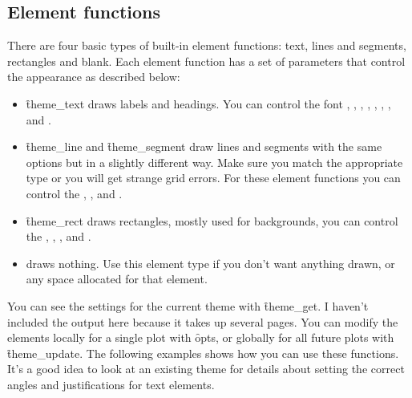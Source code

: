 \subsection{Element functions}
\label{sub:element-functions}

There are four basic types of built-in element functions: text, lines and segments, rectangles and blank.  Each element function has a set of parameters that control the appearance as described below:

\begin{itemize}
  \item \f{theme_text} draws labels and headings. You can control the font , , , , , , , and .

  \item \f{theme_line} and \f{theme_segment} draw lines and segments with the same options but in a slightly different way.  Make sure you match the appropriate type or you will get strange grid errors.  For these element functions you can control the , , and .

  \item \f{theme_rect} draws rectangles, mostly used for backgrounds, you can control the , , , and .

  \item {} draws nothing.  Use this element type if you don't want anything drawn, or any space allocated for that element.  

\end{itemize}

You can see the settings for the current theme with \f{theme_get}.  I haven't included the output here because it takes up several pages.  You can modify the elements locally for a single plot with \f{opts}, or globally for all future plots with \f{theme_update}.  The following examples shows how you can use these functions.  It's a good idea to look at an existing theme for details about setting the correct angles and justifications for text elements.

% 


